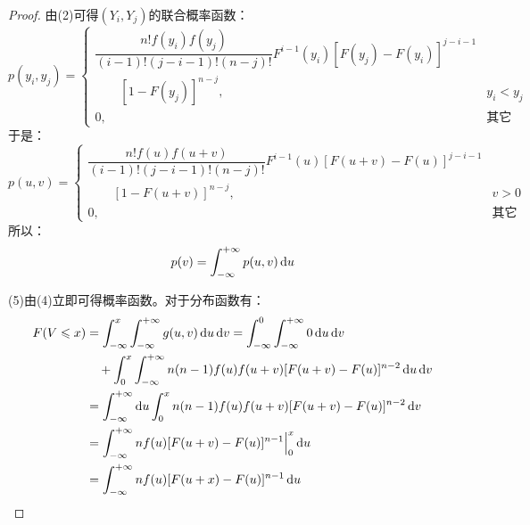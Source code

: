 \begin{proof}
	由(2)可得$(Y_i,Y_j)$的联合概率函数：
	\begin{equation*}
		p(y_i,y_j)=
		\begin{cases}
			\dfrac{n!f(y_i)f(y_j)}{(i-1)!(j-i-1)!(n-j)!}F^{i-1}(y_i)[F(y_j)-F(y_i)]^{j-i-1} \\
			\quad\quad[1-F(y_j)]^{n-j},&y_i<y_j \\
			0,&\text{其它}
		\end{cases}
	\end{equation*}
	于是：
	\begin{equation*}
		p(u,v)=
		\begin{cases}
			\dfrac{n!f(u)f(u+v)}{(i-1)!(j-i-1)!(n-j)!}F^{i-1}(u)[F(u+v)-F(u)]^{j-i-1} \\
			\quad\quad[1-F(u+v)]^{n-j},&v>0 \\
			0,&\text{其它}
		\end{cases}
	\end{equation*}
	所以：
	\begin{equation*}
		p(v)=\int_{-\infty}^{+\infty}p(u,v)\mathop{}\!\mathrm{d} u
	\end{equation*}\par
	(5)由(4)立即可得概率函数。对于分布函数有：
	\begin{align*}
		F(V\leqslant x)&=\int_{-\infty}^x\int_{-\infty}^{+\infty}g(u,v)\dif u\dif v =\int_{-\infty}^0\int_{-\infty}^{+\infty}0\dif u\dif v \\
		&\quad+\int_{0}^x\int_{-\infty}^{+\infty}n(n-1)f(u)f(u+v)[F(u+v)-F(u)]^{n-2}\dif u\dif v \\
		&=\int_{-\infty}^{+\infty}\dif u\int_{0}^xn(n-1)f(u)f(u+v)[F(u+v)-F(u)]^{n-2}\dif v \\
		&=\int_{-\infty}^{+\infty}nf(u)[F(u+v)-F(u)]^{n-1}\Big|_0^x\dif u \\
		&=\int_{-\infty}^{+\infty}nf(u)[F(u+x)-F(u)]^{n-1}\dif u \qedhere
	\end{align*}
\end{proof}

